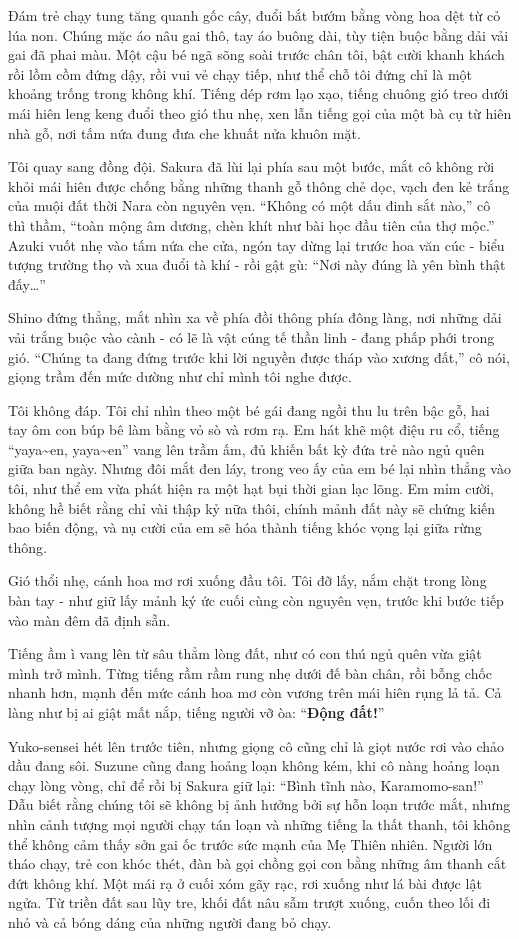\documentclass[../main.tex]{subfiles}
\begin{document}
Đám trẻ chạy tung tăng quanh gốc cây, đuổi bắt bướm bằng vòng hoa dệt từ cỏ lúa non. Chúng mặc áo nâu gai thô, tay áo buông dài, tùy tiện buộc bằng dải vải gai đã phai màu. Một cậu bé ngã sõng soài trước chân tôi, bật cười khanh khách rồi lồm cồm đứng dậy, rồi vui vẻ chạy tiếp, như thể chỗ tôi đứng chỉ là một khoảng trống trong không khí. Tiếng dép rơm lạo xạo, tiếng chuông gió treo dưới mái hiên leng keng đuổi theo gió thu nhẹ, xen lẫn tiếng gọi của một bà cụ từ hiên nhà gỗ, nơi tấm nứa đung đưa che khuất nửa khuôn mặt.

Tôi quay sang đồng đội. Sakura đã lùi lại phía sau một bước, mắt cô không rời khỏi mái hiên được chống bằng những thanh gỗ thông chẻ dọc, vạch đen kẻ trắng của muội đất thời Nara còn nguyên vẹn. ``Không có một dấu đinh sắt nào,'' cô thì thầm, ``toàn mộng âm dương, chèn khít như bài học đầu tiên của thợ mộc.'' Azuki vuốt nhẹ vào tấm nứa che cửa, ngón tay dừng lại trước hoa văn cúc - biểu tượng trường thọ và xua đuổi tà khí - rồi gật gù: ``Nơi này đúng là yên bình thật đấy\dots''

Shino đứng thẳng, mắt nhìn xa về phía đồi thông phía đông làng, nơi những dải vải trắng buộc vào cành - có lẽ là vật cúng tế thần linh - đang phấp phới trong gió. ``Chúng ta đang đứng trước khi lời nguyền được tháp vào xương đất,'' cô nói, giọng trầm đến mức dường như chỉ mình tôi nghe được.

Tôi không đáp. Tôi chỉ nhìn theo một bé gái đang ngồi thu lu trên bậc gỗ, hai tay ôm con búp bê làm bằng vỏ sò và rơm rạ. Em hát khẽ một điệu ru cổ, tiếng ``yaya\~{}en, yaya\~{}en'' vang lên trầm ấm, đủ khiến bất kỳ đứa trẻ nào ngủ quên giữa ban ngày. Nhưng đôi mắt đen láy, trong veo ấy của em bé lại nhìn thẳng vào tôi, như thể em vừa phát hiện ra một hạt bụi thời gian lạc lõng. Em mỉm cười, không hề biết rằng chỉ vài thập kỷ nữa thôi, chính mảnh đất này sẽ chứng kiến bao biến động, và nụ cười của em sẽ hóa thành tiếng khóc vọng lại giữa rừng thông.

Gió thổi nhẹ, cánh hoa mơ rơi xuống đầu tôi. Tôi đỡ lấy, nắm chặt trong lòng bàn tay - như giữ lấy mảnh ký ức cuối cùng còn nguyên vẹn, trước khi bước tiếp vào màn đêm đã định sẵn.

Tiếng ầm ì vang lên từ sâu thẳm lòng đất, như có con thú ngủ quên vừa giật mình trở mình. Từng tiếng rầm rầm rung nhẹ dưới đế bàn chân, rồi bỗng chốc nhanh hơn, mạnh đến mức cánh hoa mơ còn vương trên mái hiên rụng lả tả. Cả làng như bị ai giật mất nắp, tiếng người vỡ òa: ``\textbf{Động đất!}''

Yuko-sensei hét lên trước tiên, nhưng giọng cô cũng chỉ là giọt nước rơi vào chảo dầu đang sôi. Suzune cũng đang hoảng loạn không kém, khi cô nàng hoảng loạn chạy lòng vòng, chỉ để rồi bị Sakura giữ lại: ``Bình tĩnh nào, Karamomo-san!'' Dẫu biết rằng chúng tôi sẽ không bị ảnh hưởng bởi sự hỗn loạn trước mắt, nhưng nhìn cảnh tượng mọi người chạy tán loạn và những tiếng la thất thanh, tôi không thể không cảm thấy sởn gai ốc trước sức mạnh của Mẹ Thiên nhiên. Người lớn tháo chạy, trẻ con khóc thét, đàn bà gọi chồng gọi con bằng những âm thanh cắt đứt không khí. Một mái rạ ở cuối xóm gãy rạc, rơi xuống như lá bài được lật ngửa. Từ triền đất sau lũy tre, khối đất nâu sẫm trượt xuống, cuốn theo lối đi nhỏ và cả bóng dáng của những người đang bỏ chạy.
\end{document}
